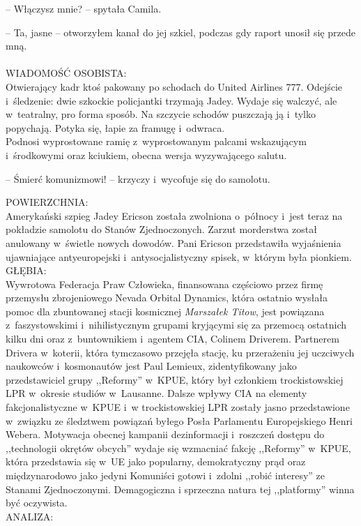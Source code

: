 \documentclass[oneside,polish,12pt,sfheadings]{mwbk}
\begin{document}
-- Włączysz mnie? -- spytała Camila.

-- Ta, jasne -- otworzyłem kanał do jej szkiel, podczas gdy raport unosił
się przede mną.\\
\\
WIADOMOŚĆ OSOBISTA:\\
Otwierający kadr ktoś pakowany po schodach do United Airlines 777.
Odejście i~śledzenie: dwie szkockie policjantki trzymają Jadey. Wydaje
się walczyć, ale w~teatralny, pro forma sposób. Na szczycie schodów
puszczają ją i~tylko popychają. Potyka się, łapie za framugę i~odwraca.\\
Podnosi wyprostowane ramię z~wyprostowanym palcami wskazującym i~środkowymi oraz kciukiem, obecna wersja wyzywającego salutu.

-- Śmierć komunizmowi! -- krzyczy i~wycofuje się do samolotu.

POWIERZCHNIA:\\
Amerykański szpieg Jadey Ericson została zwolniona o~północy i~jest
teraz na pokładzie samolotu do Stanów Zjednoczonych. Zarzut morderstwa
został anulowany w~świetle nowych dowodów. Pani Ericson przedstawiła
wyjaśnienia ujawniające antyeuropejski i~antysocjalistyczny spisek, w~którym była pionkiem.\\
GŁĘBIA:\\
Wywrotowa Federacja Praw Człowieka, finansowana częściowo przez firmę
przemysłu zbrojeniowego Nevada Orbital Dynamics, która ostatnio wysłała
pomoc dla zbuntowanej stacji kosmicznej \emph{Marszałek Titow}, jest
powiązana z~faszystowskimi i~nihilistycznym grupami kryjącymi się za
przemocą ostatnich kilku dni oraz z~buntownikiem i~agentem CIA, Colinem
Driverem. Partnerem Drivera w~koterii, która tymczasowo przejęła stację,
ku przerażeniu jej uczciwych naukowców i~kosmonautów jest Paul Lemieux,
zidentyfikowany jako przedstawiciel grupy ,,Reformy'' w~KPUE, który był
członkiem trockistowskiej LPR w~okresie studiów w~Lausanne. Dalsze
wpływy CIA na elementy fakcjonalistyczne w~KPUE i~w trockistowskiej LPR
zostały jasno przedstawione w~związku ze śledztwem powiązań byłego Posła
Parlamentu Europejskiego Henri Webera. Motywacja obecnej kampanii
dezinformacji i~roszczeń dostępu do ,,technologii okrętów obcych'' wydaje
się wzmacniać fakcję ,,Reformy'' w~KPUE, która przedstawia się w~UE jako
popularny, demokratyczny prąd oraz międzynarodowo jako jedyni Komuniści
gotowi i~zdolni ,,robić interesy'' ze Stanami Zjednoczonymi. Demagogiczna
i sprzeczna natura tej ,,platformy'' winna być oczywista.\\
ANALIZA:\\
\end{document}
